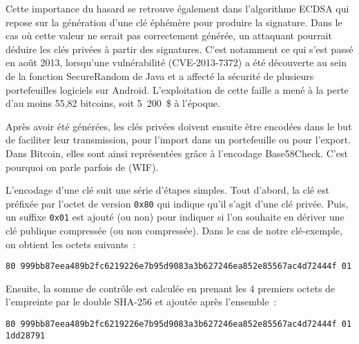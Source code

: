 Cette importance du hasard se retrouve également dans l'algorithme ECDSA qui repose sur la génération d'une clé éphémère pour produire la signature. Dans le cas où cette valeur ne serait pas correctement générée, un attaquant pourrait déduire les clés privées à partir des signatures. C'est notamment ce qui s'est passé en août 2013, lorsqu'une vulnérabilité (CVE-2013-7372) a été découverte au sein de la fonction SecureRandom de Java et a affecté la sécurité de plusieurs portefeuilles logiciels sur Android. L'exploitation de cette faille a mené à la perte d'au moins 55,82 bitcoins, soit 5~200~\$ à l'époque. %


Après avoir été générées, les clés privées doivent ensuite être encodées dans le but de faciliter leur transmission, pour l'import dans un portefeuille ou pour l'export. Dans Bitcoin, elles sont ainsi représentées grâce à l'encodage Base58Check. C'est pourquoi on parle parfois de  (WIF).

L'encodage d'une clé suit une série d'étapes simples. Tout d'abord, la clé est préfixée par l'octet de version \texttt{0x80} qui indique qu'il s'agit d'une clé privée. Puis, un suffixe \texttt{0x01} est ajouté (ou non) pour indiquer si l'on souhaite en dériver une clé publique compressée (ou non compressée). Dans le cas de notre clé-exemple, on obtient les octets suivants~:

\begin{Verbatim}[fontsize=\scriptsize]
80 999bb87eea489b2fc6219226e7b95d9083a3b627246ea852e85567ac4d72444f 01
\end{Verbatim}

Ensuite, la somme de contrôle est calculée en prenant les 4 premiers octets de l'empreinte par le double SHA-256 et ajoutée après l'ensemble~:


\begin{Verbatim}[fontsize=\scriptsize]
80 999bb87eea489b2fc6219226e7b95d9083a3b627246ea852e85567ac4d72444f 01
1dd28791
\end{Verbatim}

